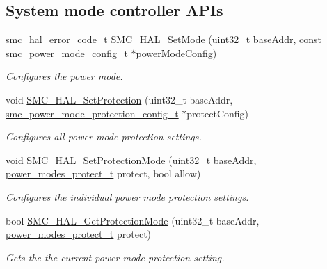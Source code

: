 \subsection*{System mode controller A\+P\+Is}
\begin{DoxyCompactItemize}
\item 
\hyperlink{group__smc__hal_ga2b751667d499e320a58e84ac74abad59}{smc\+\_\+hal\+\_\+error\+\_\+code\+\_\+t} \hyperlink{group__smc__hal_ga9a22b370f86f0e65a0b37497839fb915}{S\+M\+C\+\_\+\+H\+A\+L\+\_\+\+Set\+Mode} (uint32\+\_\+t base\+Addr, const \hyperlink{group__smc__hal_gac4d791fd10f8c9951613d7f50d91b14f}{smc\+\_\+power\+\_\+mode\+\_\+config\+\_\+t} $\ast$power\+Mode\+Config)
\begin{DoxyCompactList}\small\item\em Configures the power mode. \end{DoxyCompactList}\item 
void \hyperlink{group__smc__hal_ga1fbdebece0b2d0b6a4a2835891076e20}{S\+M\+C\+\_\+\+H\+A\+L\+\_\+\+Set\+Protection} (uint32\+\_\+t base\+Addr, \hyperlink{group__smc__hal_ga436ce8544adaf5118a524c8efda9aa9c}{smc\+\_\+power\+\_\+mode\+\_\+protection\+\_\+config\+\_\+t} $\ast$protect\+Config)
\begin{DoxyCompactList}\small\item\em Configures all power mode protection settings. \end{DoxyCompactList}\item 
void \hyperlink{group__smc__hal_gab0e0485296fcc2633e4e7576006d1f3d}{S\+M\+C\+\_\+\+H\+A\+L\+\_\+\+Set\+Protection\+Mode} (uint32\+\_\+t base\+Addr, \hyperlink{group__smc__hal_ga91e04aaf3e5d942ab1f3f6a65f4a5dd8}{power\+\_\+modes\+\_\+protect\+\_\+t} protect, bool allow)
\begin{DoxyCompactList}\small\item\em Configures the individual power mode protection settings. \end{DoxyCompactList}\item 
bool \hyperlink{group__smc__hal_ga4dedf2e80b6506686c8d1601ada5825e}{S\+M\+C\+\_\+\+H\+A\+L\+\_\+\+Get\+Protection\+Mode} (uint32\+\_\+t base\+Addr, \hyperlink{group__smc__hal_ga91e04aaf3e5d942ab1f3f6a65f4a5dd8}{power\+\_\+modes\+\_\+protect\+\_\+t} protect)
\begin{DoxyCompactList}\small\item\em Gets the the current power mode protection setting. \end{DoxyCompactList}\item 

\end{DoxyCompactItemize}
